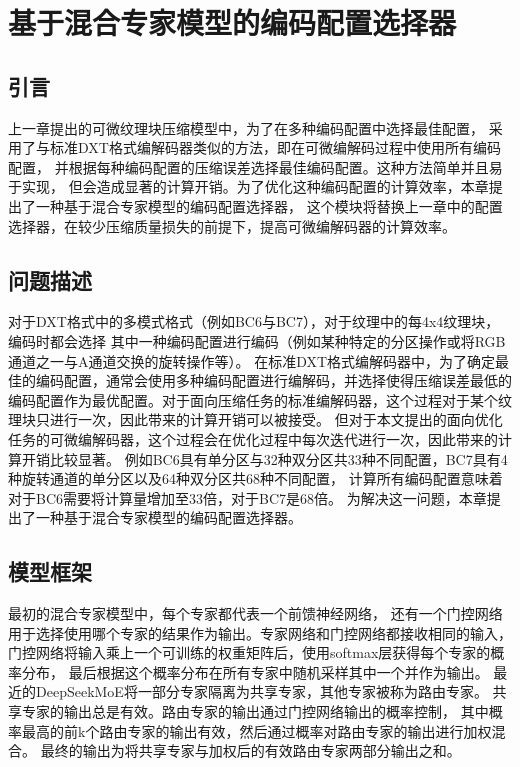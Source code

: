 
\chapter{基于混合专家模型的编码配置选择器}

\section{引言}

上一章提出的可微纹理块压缩模型中，为了在多种编码配置中选择最佳配置，
采用了与标准DXT格式编解码器类似的方法，即在可微编解码过程中使用所有编码配置，
并根据每种编码配置的压缩误差选择最佳编码配置。这种方法简单并且易于实现，
但会造成显著的计算开销。为了优化这种编码配置的计算效率，本章提出了一种基于混合专家模型的编码配置选择器，
这个模块将替换上一章中的配置选择器，在较少压缩质量损失的前提下，提高可微编解码器的计算效率。

\section{问题描述}

对于DXT格式中的多模式格式（例如BC6与BC7），对于纹理中的每4x4纹理块，编码时都会选择
其中一种编码配置进行编码（例如某种特定的分区操作或将RGB通道之一与A通道交换的旋转操作等）。
在标准DXT格式编解码器中，为了确定最佳的编码配置，通常会使用多种编码配置进行编解码，并选择使得压缩误差最低的
编码配置作为最优配置。对于面向压缩任务的标准编解码器，这个过程对于某个纹理块只进行一次，因此带来的计算开销可以被接受。
但对于本文提出的面向优化任务的可微编解码器，这个过程会在优化过程中每次迭代进行一次，因此带来的计算开销比较显著。
例如BC6具有单分区与32种双分区共33种不同配置，BC7具有4种旋转通道的单分区以及64种双分区共68种不同配置，
计算所有编码配置意味着对于BC6需要将计算量增加至33倍，对于BC7是68倍。
为解决这一问题，本章提出了一种基于混合专家模型的编码配置选择器。

\section{模型框架}

最初的混合专家模型中，每个专家都代表一个前馈神经网络，
还有一个门控网络用于选择使用哪个专家的结果作为输出。专家网络和门控网络都接收相同的输入，
门控网络将输入乘上一个可训练的权重矩阵后，使用softmax层获得每个专家的概率分布，
最后根据这个概率分布在所有专家中随机采样其中一个并作为输出。
最近的DeepSeekMoE\cite{dai2024deepseekmoe}将一部分专家隔离为共享专家，其他专家被称为路由专家。
共享专家的输出总是有效。路由专家的输出通过门控网络输出的概率控制，
其中概率最高的前k个路由专家的输出有效，然后通过概率对路由专家的输出进行加权混合。
最终的输出为将共享专家与加权后的有效路由专家两部分输出之和。

